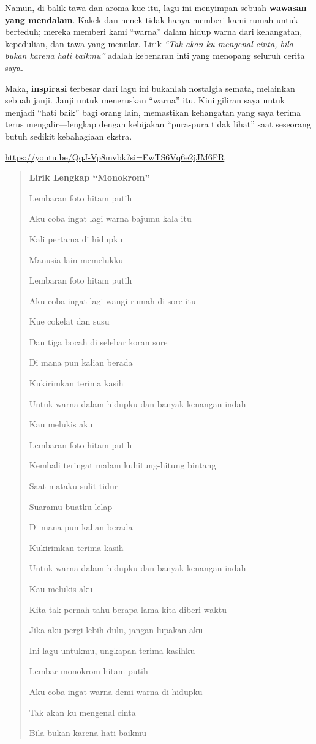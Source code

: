 \documentclass[
  letterpaper,
  DIV=11,
  numbers=noendperiod]{scrreprt}
\begin{document}
Namun, di balik tawa dan aroma kue itu, lagu ini menyimpan sebuah
\textbf{wawasan yang mendalam}. Kakek dan nenek tidak hanya memberi kami
rumah untuk berteduh; mereka memberi kami ``warna'' dalam hidup warna
dari kehangatan, kepedulian, dan tawa yang menular. Lirik \emph{``Tak
akan ku mengenal cinta, bila bukan karena hati baikmu''} adalah
kebenaran inti yang menopang seluruh cerita saya.

Maka, \textbf{inspirasi} terbesar dari lagu ini bukanlah nostalgia
semata, melainkan sebuah janji. Janji untuk meneruskan ``warna'' itu.
Kini giliran saya untuk menjadi ``hati baik'' bagi orang lain,
memastikan kehangatan yang saya terima terus mengalir---lengkap dengan
kebijakan ``pura-pura tidak lihat'' saat seseorang butuh sedikit
kebahagiaan ekstra.

\url{https://youtu.be/QqJ-Vp8mvbk?si=EwTS6Vq6e2jJM6FR}

\begin{quote}
\textbf{Lirik Lengkap ``Monokrom''}

Lembaran foto hitam putih

Aku coba ingat lagi warna bajumu kala itu

Kali pertama di hidupku

Manusia lain memelukku

Lembaran foto hitam putih

Aku coba ingat lagi wangi rumah di sore itu

Kue cokelat dan susu

Dan tiga bocah di selebar koran sore

Di mana pun kalian berada

Kukirimkan terima kasih

Untuk warna dalam hidupku dan banyak kenangan indah

Kau melukis aku

Lembaran foto hitam putih

Kembali teringat malam kuhitung-hitung bintang

Saat mataku sulit tidur

Suaramu buatku lelap

Di mana pun kalian berada

Kukirimkan terima kasih

Untuk warna dalam hidupku dan banyak kenangan indah

Kau melukis aku

Kita tak pernah tahu berapa lama kita diberi waktu

Jika aku pergi lebih dulu, jangan lupakan aku

Ini lagu untukmu, ungkapan terima kasihku

Lembar monokrom hitam putih

Aku coba ingat warna demi warna di hidupku

Tak akan ku mengenal cinta

Bila bukan karena hati baikmu
\end{quote}
\end{document}
